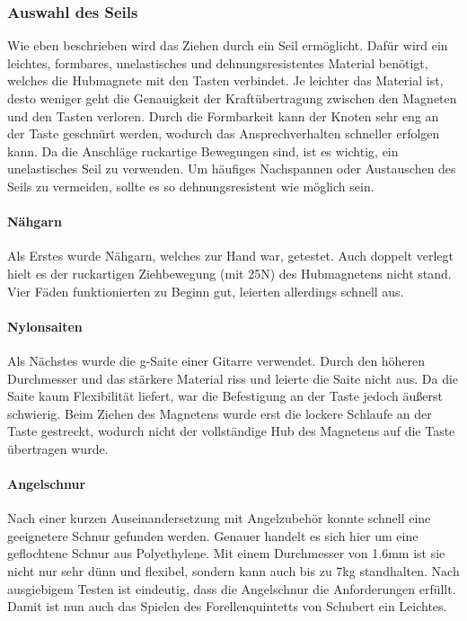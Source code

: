 \subsubsection{Auswahl des Seils}

Wie eben beschrieben wird das Ziehen durch ein Seil ermöglicht.
Dafür wird ein leichtes, formbares, unelastisches und dehnungsresistentes Material benötigt, welches die Hubmagnete mit den Tasten verbindet.
Je leichter das Material ist, desto weniger geht die Genauigkeit der Kraftübertragung zwischen den Magneten und den Tasten verloren.
Durch die Formbarkeit kann der Knoten sehr eng an der Taste geschnürt werden, wodurch das Ansprechverhalten schneller erfolgen kann.
Da die Anschläge ruckartige Bewegungen sind, ist es wichtig, ein unelastisches Seil zu verwenden.
Um häufiges Nachspannen oder Austauschen des Seils zu vermeiden, sollte es so dehnungsresistent wie möglich sein.

\paragraph{Nähgarn}

Als Erstes wurde Nähgarn, welches zur Hand war, getestet.
Auch doppelt verlegt hielt es der ruckartigen Ziehbewegung (mit 25N) des Hubmagnetens nicht stand.
Vier Fäden funktionierten zu Beginn gut, leierten allerdings schnell aus.

\paragraph{Nylonsaiten}

Als Nächstes wurde die g-Saite einer Gitarre verwendet.
Durch den höheren Durchmesser und das stärkere Material riss und leierte die Saite nicht aus.
Da die Saite kaum Flexibilität liefert, war die Befestigung an der Taste jedoch äußerst schwierig.
Beim Ziehen des Magnetens wurde erst die lockere Schlaufe an der Taste gestreckt, wodurch nicht der vollständige Hub des Magnetens auf die Taste übertragen wurde.

\paragraph{Angelschnur}

Nach einer kurzen Auseinandersetzung mit Angelzubehör konnte schnell eine geeignetere Schnur gefunden werden.
Genauer handelt es sich hier um eine geflochtene Schnur aus Polyethylene.
Mit einem Durchmesser von 1.6mm ist sie nicht nur sehr dünn und flexibel, sondern kann auch bis zu 7kg standhalten.
Nach ausgiebigem Testen ist eindeutig, dass die Angelschnur die Anforderungen erfüllt.
Damit ist nun auch das Spielen des Forellenquintetts von Schubert ein Leichtes.

